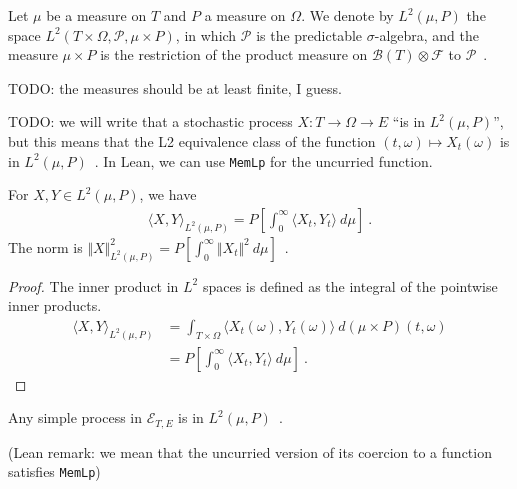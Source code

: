 \begin{definition}\label{def:L2Predictable}
  \leanok
Let $\mu$ be a measure on $T$ and $P$ a measure on $\Omega$.
We denote by $L^2(\mu, P)$ the space $L^2(T \times \Omega, \mathcal{P}, \mu \times P)$, in which $\mathcal{P}$ is the predictable $\sigma$-algebra, and the measure $\mu \times P$ is the restriction of the product measure on $\mathcal{B}(T) \otimes \mathcal{F}$ to $\mathcal{P}$~.
\end{definition}

TODO: the measures should be at least finite, I guess.

TODO: we will write that a stochastic process $X : T \to \Omega \to E$ ``is in $L^2(\mu, P)$'', but this means that the L2 equivalence class of the function $(t, \omega) \mapsto X_t(\omega)$ is in $L^2(\mu, P)$~.
In Lean, we can use \texttt{MemLp} for the uncurried function.


\begin{lemma}\label{lem:L2Predictable.inner_eq}
For $X, Y \in L^2(\mu, P)$, we have
\begin{align*}
  \langle X, Y \rangle_{L^2(\mu, P)} = P\left[ \int_0^{\infty} \langle X_t, Y_t\rangle \: d\mu \right]
  \: .
\end{align*}
The norm is $\Vert X \Vert_{L^2(\mu, P)}^2 = P\left[ \int_0^{\infty} \Vert X_t \Vert^2 \: d\mu \right]$~.
\end{lemma}

\begin{proof}
The inner product in $L^2$ spaces is defined as the integral of the pointwise inner products.
\begin{align*}
  \langle X, Y \rangle_{L^2(\mu, P)}
  &= \int_{T \times \Omega} \langle X_t(\omega), Y_t(\omega) \rangle \: d(\mu \times P)(t, \omega)
  \\
  &= P\left[ \int_0^{\infty} \langle X_t, Y_t\rangle \: d\mu \right]
  \: .
\end{align*}
\end{proof}


\begin{lemma}\label{lem:simpleProcess_mem_L2Predictable}
Any simple process in $\mathcal{E}_{T, E}$ is in $L^2(\mu, P)$~.

(Lean remark: we mean that the uncurried version of its coercion to a function satisfies \texttt{MemLp})
\end{lemma}

